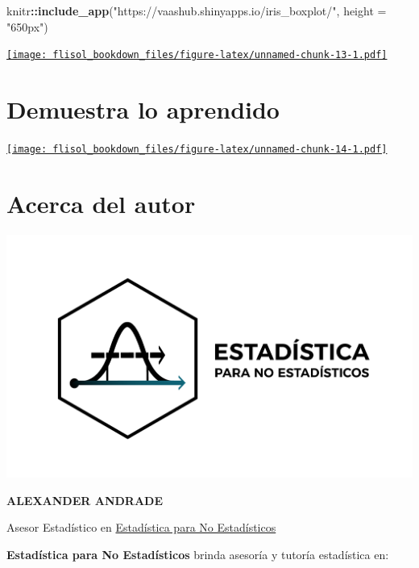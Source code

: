 \documentclass[
]{book}
\newenvironment{Shaded}{\begin{snugshade}}{\end{snugshade}}
\newcommand{\DataTypeTok}[1]{\textcolor[rgb]{0.13,0.29,0.53}{#1}}
\newcommand{\KeywordTok}[1]{\textcolor[rgb]{0.13,0.29,0.53}{\textbf{#1}}}
\newcommand{\NormalTok}[1]{#1}
\newcommand{\OperatorTok}[1]{\textcolor[rgb]{0.81,0.36,0.00}{\textbf{#1}}}
\newcommand{\StringTok}[1]{\textcolor[rgb]{0.31,0.60,0.02}{#1}}
\begin{document}
\begin{Shaded}
\begin{Highlighting}[]
\NormalTok{knitr}\OperatorTok{::}\KeywordTok{include_app}\NormalTok{(}\StringTok{"https://vaashub.shinyapps.io/iris_boxplot/"}\NormalTok{, }
  \DataTypeTok{height =} \StringTok{"650px"}\NormalTok{)}
\end{Highlighting}
\end{Shaded}

\href{https://vaashub.shinyapps.io/iris_boxplot/}{\texttt{[image: flisol\_bookdown\_files/figure-latex/unnamed-chunk-13-1.pdf]}}

\hypertarget{demuestra-lo-aprendido}{%
\chapter{Demuestra lo aprendido}\label{demuestra-lo-aprendido}}

\href{https://vaashub.shinyapps.io/quiz/}{\texttt{[image: flisol\_bookdown\_files/figure-latex/unnamed-chunk-14-1.pdf]}}

\hypertarget{acerca-del-autor}{%
\chapter{Acerca del autor}\label{acerca-del-autor}}

\begin{flushleft}\includegraphics[width=1\linewidth]{new} \end{flushleft}

\textbf{ALEXANDER ANDRADE}

Asesor Estadístico en \href{https://www.estadisticaparanoestadisticos.com}{Estadística para No Estadísticos}

\textbf{Estadística para No Estadísticos} brinda asesoría y tutoría estadística en:
\end{document}
